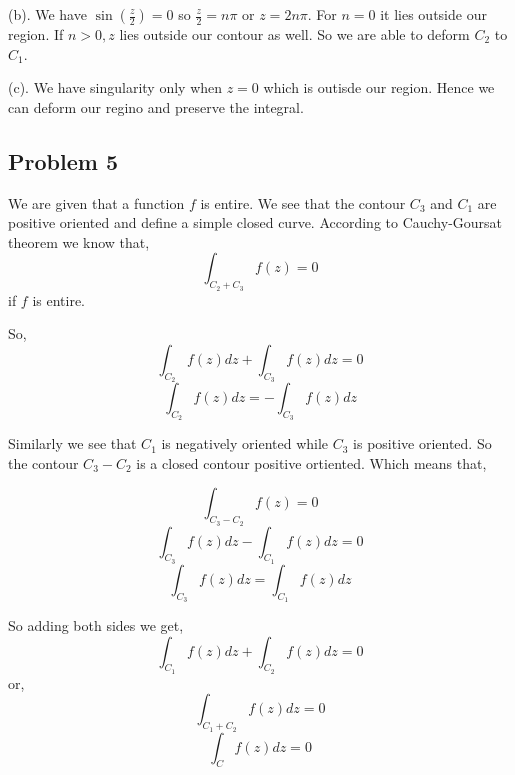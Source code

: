 \documentclass[a4paper]{report}
\begin{document}
(b). We have $\sin(\frac{z}{2}) = 0$ so $\frac{z}{2} = n\pi$ or $z = 2n\pi$. For $n = 0$ it lies outside our region. If $n > 0, z$ lies outside our contour as well. So we are able to deform $C_2$ to $C_1$. 

(c). We have singularity only when  $z = 0$ which is outisde our region. Hence we can deform our regino and preserve the integral.

\subsection*{Problem 5}
We are given that a function $f$ is entire. We see that the contour $C_3$ and $C_1$ are positive oriented and define a simple closed curve. According to Cauchy-Goursat theorem we know that, 
$$ \int_{C_2+C_3}f(z) =0 $$  if $f$ is entire.

So, $$\int_{C_2} f(z) dz+ \int_{C_3} f(z) dz= 0$$
$$\int_{C_2} f(z) dz =-  \int_{C_3} f(z) dz$$

Similarly we see that $C_1$ is negatively oriented while $C_3$ is positive oriented. So the contour $C_3 - C_2$ is a closed contour positive ortiented. Which means that, 

$$ \int_{C_3-C_2}f(z) =0 $$
$$\int_{C_3} f(z) dz- \int_{C_1} f(z) dz= 0$$
$$\int_{C_3} f(z) dz = \int_{C_1} f(z) dz$$


So adding both sides we get, 
$$ \int_{C_1} f(z) dz + \int_{C_2} f(z) dz= 0 $$ or, 
$$ \int_{C_1 + C_2} f(z) dz  = 0 $$
$$ \int_{C} f(z) dz  = 0 $$
\end{document}
